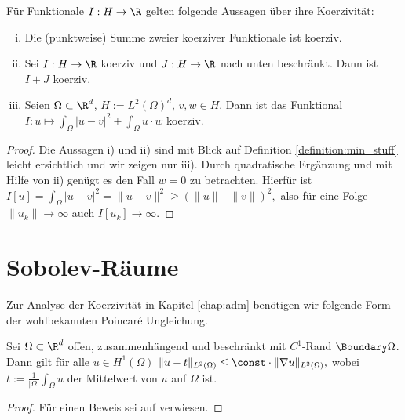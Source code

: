 \documentclass{mythesis}
\begin{document}
\begin{lemma} \label{lem:coercivity}
    Für Funktionale $I: H \to \R$ gelten folgende Aussagen über ihre Koerzivität:
    \begin{enumerate}[i)]
        \item
	   Die (punktweise) Summe zweier koerziver Funktionale ist koerziv.
       \item
	   Sei $I: H \to \R$ koerziv und $J: H \to \R$ nach unten beschränkt.
	   Dann ist $I + J$ koerziv.
       \item
	   Seien $\Omega \subset \R^d$, $H := L^2(\Omega)^d$, $v, w \in H$.
	   Dann ist das Funktional
	   \begin{math}
	       I: u \mapsto \int_\Omega |u - v|^2 + \int_\Omega u \cdot w
	   \end{math}
	   koerziv.
    \end{enumerate}
    \begin{proof}
	Die Aussagen i) und ii) sind mit Blick auf Definition \ref{definition:min_stuff} leicht ersichtlich und wir zeigen nur iii).
	Durch quadratische Ergänzung und mit Hilfe von ii) genügt es den Fall $w = 0$ zu betrachten.
	Hierfür ist
	\begin{math}
	    I[u] = \int_\Omega |u - v|^2 = \|u - v\|^2 \ge (\|u\| - \|v\|)^2,
	\end{math}
	also für eine Folge $\|u_k\| \to \infty$ auch $I[u_k] \to \infty$.
    \end{proof}
\end{lemma}

\section*{Sobolev-Räume}

Zur Analyse der Koerzivität in Kapitel \ref{chap:adm} benötigen wir folgende Form der wohlbekannten Poincaré Ungleichung.

\begin{theorem} \label{thm:poincare-wirtinger}
    Sei $\Omega \subset \R^d$ offen, zusammenhängend und beschränkt mit $C^1$-Rand $\Boundary \Omega$.
    Dann gilt für alle $u \in H^1(\Omega)$
    \begin{math}
	\|u - t\|_{L^2(\Omega)} \le \const \cdot \|\nabla u\|_{L^2(\Omega)},
    \end{math}
    wobei $t := \frac{1}{|\Omega|} \int_\Omega u$ der Mittelwert von $u$ auf $\Omega$ ist.
    \begin{proof}
        Für einen Beweis sei auf \cite[§5.8.1]{evans2010partial} verwiesen.
    \end{proof}
\end{theorem}
\end{document}
